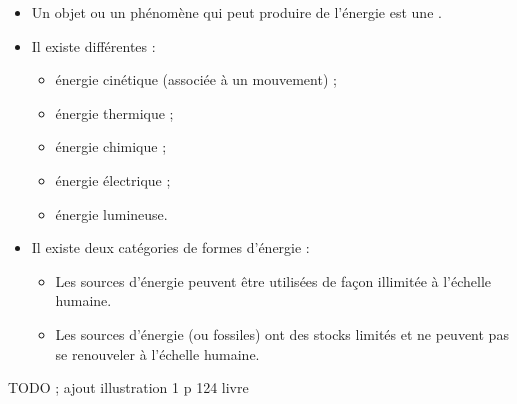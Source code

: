 \begin{mybilan}
	\begin{itemize}
		
		\item Un objet ou un phénomène qui peut produire de l'énergie est une .
				
		\item Il existe différentes  :
		
			\begin{itemize}
				\item énergie cinétique (associée à un mouvement) ;
				\item énergie thermique ;
				\item énergie chimique ;
				\item énergie électrique ;
				\item énergie lumineuse.
			\end{itemize}
		
		\item Il existe deux catégories de formes d'énergie :
			\begin{itemize}
				\item Les sources d'énergie  peuvent être utilisées de façon illimitée à l'échelle humaine.
				\item Les sources d'énergie  (ou fossiles) ont des stocks limités et ne peuvent pas se renouveler à l'échelle humaine.
			\end{itemize}
	\end{itemize}


	TODO ; ajout illustration 1 p 124 livre
\end{mybilan}
